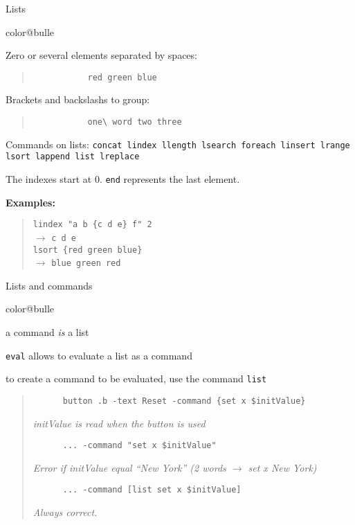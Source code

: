 \documentclass[a4paper,landscape,smooth]{show}
\newcommand{\tclex}[2]{\texttt{#1}\\$\rightarrow$ \texttt{#2}}
\begin{document}

\begin{tslide}{Lists}
   \vfill
   \begin{bitemize}{color@bulle}
      \item Zero or several  elements separated by spaces:
	 \begin{quote}
	    \begin{verbatim}
	       red green blue
	    \end{verbatim}
	 \end{quote}

      \item Brackets and backslashs to group:
	 \begin{quote}
	    \begin{verbatim}
	       one\ word two three
	    \end{verbatim}
	 \end{quote}

      \item Commands on lists: \texttt{concat lindex llength lsearch
	 foreach linsert lrange lsort lappend list lreplace}

      \item The indexes start at 0. \texttt{end} represents the last element.
   \end{bitemize}
   \vfill
   \textbf{Examples:}
   \begin{quote}
      \tclex{lindex "a b \{c d e\} f" 2}{c d e}\\
      \tclex{lsort \{red green blue\}}{blue green red}
   \end{quote}
   \vfill
\end{tslide}


\begin{tslide}{Lists and commands}
   \vfill
   \begin{bitemize}{color@bulle}
      \item a command \emph{is} a list
      \item \texttt{eval} allows to evaluate a list as a command
      \item to create a command to be evaluated, use the command
	    \texttt{list}
   \end{bitemize}
   \vfill
   \begin{quote}
   \begin{verbatim}
      button .b -text Reset -command {set x $initValue}
   \end{verbatim} %
   \emph{initValue is read when the button is used}
   \begin{verbatim}
      ... -command "set x $initValue"
   \end{verbatim} %
   \emph{Error if initValue equal ``New York'' (2 words $\rightarrow$ set
	 x New York)}
   \begin{verbatim}
      ... -command [list set x $initValue]
   \end{verbatim} %
   \emph{Always correct.}
   \end{quote}
   \vfill
\end{tslide}
\end{document}
